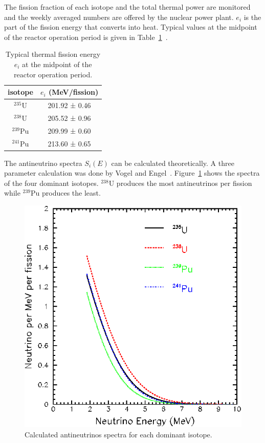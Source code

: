 The fission fraction of each isotope and the total thermal power are monitored and the weekly averaged numbers are offered by the nuclear power plant. $e_i$ is the part of the fission energy that converts into heat. Typical values at the midpoint of the reactor operation period is given in Table~\ref{table:thermal_fission_energy}~\cite{Kopeikin2004}.
\begin{table}
	\centering
	\begin{tabular}{|c|c|}
	\hline
	isotope & $e_i$ (MeV/fission) \\
	\hline
	$^{235}$U & 201.92 ± 0.46 \\
	$^{238}$U & 205.52 ± 0.96 \\
	$^{239}$Pu & 209.99 ± 0.60 \\
	$^{241}$Pu & 213.60 ± 0.65 \\
	\hline
	\end{tabular}
	\caption{Typical thermal fission energy $e_i$ at the midpoint of the reactor operation period.}
	\label{table:thermal_fission_energy}
\end{table}

The antineutrino spectra $S_i(E)$ can be calculated theoretically. A three parameter calculation was done by Vogel and Engel~\cite{Vogel1989}. Figure~\ref{figure:isotope_antineutrino_spectra} shows the spectra of the four dominant isotopes. $^{238}$U produces the most antineutrinos per fission while $^{239}$Pu produces the least.
\begin{figure}
	\centering
	\includegraphics[width=.5\textwidth]{figures/chap1/isotope_antineutrino_spectra.eps}
	\caption{Calculated antineutrinos spectra for each dominant isotope.}
	\label{figure:isotope_antineutrino_spectra}
\end{figure}


